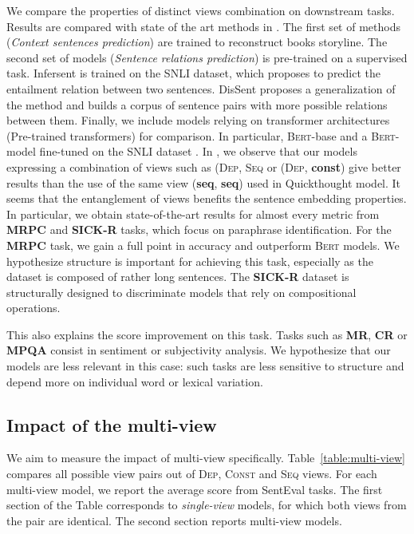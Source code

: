 We compare the properties of distinct views combination on downstream tasks. Results are compared with state of the art methods in . The first set of methods (\textsl{Context sentences prediction}) are trained to reconstruct books storyline. %
The second set of models (\textsl{Sentence relations prediction}) is pre-trained on a supervised task. Infersent \parencite{conneau_17} is trained on the SNLI dataset, which proposes to predict the entailment relation between two sentences. DisSent \parencite{nie_19} proposes a generalization of the method and builds a corpus of sentence pairs with more possible relations between them. Finally, we include models relying on transformer architectures (Pre-trained transformers) for comparison. In particular, \textsc{Bert}-base and a \textsc{Bert}-model fine-tuned on the SNLI dataset \cite{reimers_19}. 
In , we observe that our models expressing a combination of views such as (\textsc{Dep}, \textsc{Seq} or (\textsc{Dep}, \textbf{const}) give better results than the use of the same view (\textbf{seq}, \textbf{seq}) used in Quickthought model. It seems that the entanglement of views benefits the sentence embedding properties. In particular, we obtain state-of-the-art results for almost every metric from \textbf{MRPC} and \textbf{SICK-R} tasks, which focus on paraphrase identification. For the \textbf{MRPC} task, we gain a full point in accuracy and outperform \textsc{Bert} models. We hypothesize structure is important for achieving this task, especially as the dataset is composed of rather long sentences. The \textbf{SICK-R} dataset is structurally designed to discriminate models that rely on compositional operations. 

This also explains the score improvement on this task. Tasks such as \textbf{MR}, \textbf{CR} or \textbf{MPQA} consist in sentiment or subjectivity analysis. We hypothesize that our models are less relevant in this case: such tasks are less sensitive to structure and depend more on individual word or lexical variation.

\subsection{Impact of the multi-view}

We aim to measure the impact of multi-view specifically. Table~\ref{table:multi-view} compares all possible view pairs out of \textsc{Dep}, \textsc{Const} and \textsc{Seq} views. For each multi-view model, we report the average score from SentEval tasks. The first section of the Table corresponds to \textit{single-view} models, for which both views from the pair are identical. The second section reports multi-view models. 

